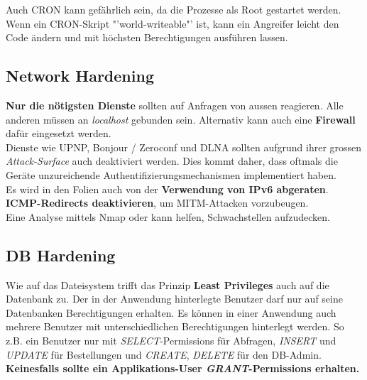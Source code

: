 Auch CRON kann gefährlich sein, da die Prozesse als Root gestartet werden. Wenn ein CRON-Skript "'world-writeable"' ist, kann ein Angreifer leicht den Code ändern und mit höchsten Berechtigungen ausführen lassen.

\subsection{Network Hardening}
\textbf{Nur die nötigsten Dienste} sollten auf Anfragen von aussen reagieren. Alle anderen müssen an \textit{localhost} gebunden sein. Alternativ kann auch eine \textbf{Firewall} dafür eingesetzt werden.\\
Dienste wie UPNP, Bonjour / Zeroconf und DLNA sollten aufgrund ihrer grossen \textit{Attack-Surface} auch deaktiviert werden. Dies kommt daher, dass oftmals die Geräte unzureichende Authentifizierungsmechanismen implementiert haben.\\

Es wird in den Folien auch von der \textbf{Verwendung von IPv6 abgeraten}.\\

\textbf{ICMP-Redirects deaktivieren}, um MITM-Attacken vorzubeugen.\\

Eine Analyse mittels Nmap oder  kann helfen, Schwachstellen aufzudecken.

\subsection{DB Hardening}
Wie auf das Dateisystem trifft das Prinzip \textbf{Least Privileges} auch auf die Datenbank zu. Der in der Anwendung hinterlegte Benutzer darf nur auf seine Datenbanken Berechtigungen erhalten. Es können in einer Anwendung auch mehrere Benutzer mit unterschiedlichen Berechtigungen hinterlegt werden. So z.B. ein Benutzer nur mit \textit{SELECT}-Permissions für Abfragen, \textit{INSERT} und \textit{UPDATE} für Bestellungen und \textit{CREATE}, \textit{DELETE} für den DB-Admin.\\
\textbf{Keinesfalls sollte ein Applikations-User \textit{GRANT}-Permissions erhalten.}